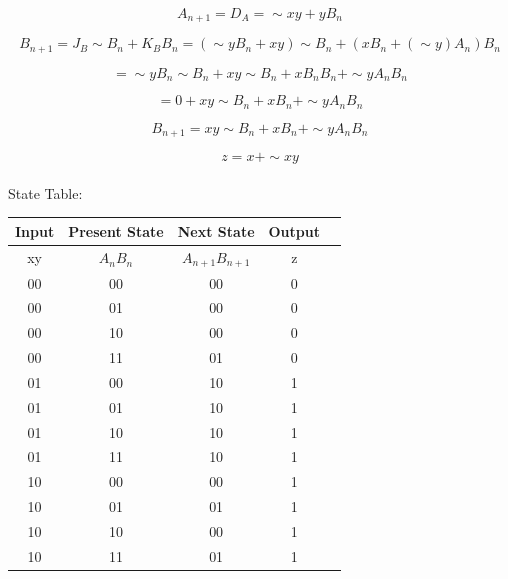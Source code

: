 \documentclass{article}
\begin{document}
 {
    $$
        A_{n+1} = D_A = \sim xy + yB_n
    $$

    $$
        B_{n+1} = J_B \sim B_n + K_B B_n = (\sim y B_n + xy) \sim B_n + (x B_n + (\sim y) A_n) B_n
    $$

    $$
        = \sim y B_n \sim B_n + xy \sim B_n + x B_n B_n + \sim y A_n B_n
    $$

    $$
        = 0 + xy \sim B_n + x B_n + \sim y A_n B_n
    $$

    $$
        B_{n+1} = xy \sim B_n + x B_n + \sim y A_n B_n
    $$

    $$
        z = x + \sim xy
    $$ \\
    State Table: \\
    \linebreak
    \begin{tabular}{|c|c|c|c|c|}
        \hline
        Input & Present State & Next State        & Output \\
        \hline
        xy    & $A_n B_n$     & $A_{n+1} B_{n+1}$ & z      \\
        \hline
        00    & 00            & 00                & 0      \\
        \hline
        00    & 01            & 00                & 0      \\
        \hline
        00    & 10            & 00                & 0      \\
        \hline
        00    & 11            & 01                & 0      \\
        \hline
        01    & 00            & 10                & 1      \\
        \hline
        01    & 01            & 10                & 1      \\
        \hline
        01    & 10            & 10                & 1      \\
        \hline
        01    & 11            & 10                & 1      \\
        \hline
        10    & 00            & 00                & 1      \\
        \hline
        10    & 01            & 01                & 1      \\
        \hline
        10    & 10            & 00                & 1      \\
        \hline
        10    & 11            & 01                & 1      \\

\end{tabular}}
\end{document}
